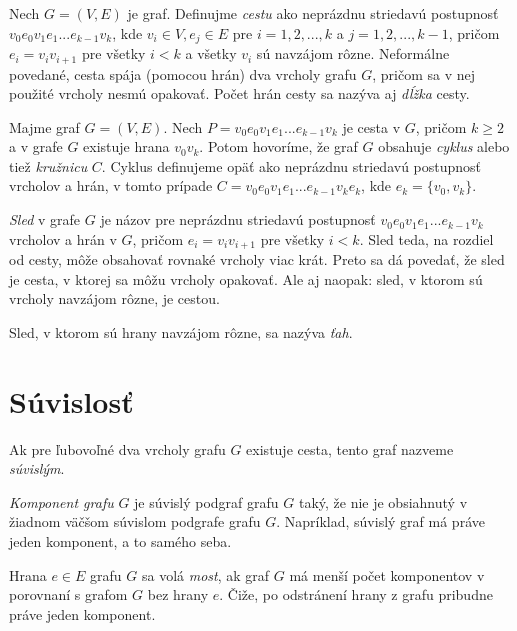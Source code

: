 Nech $G = (V, E)$ je graf. Definujme \textit{cestu} ako neprázdnu striedavú postupnosť $v_{0}e_{0}v_{1}e_{1} ... e_{k-1}v_{k}$, kde $ v_{i} \in V, e_{j} \in E$ pre $i = 1, 2, ..., k$ a $j = 1, 2, ..., k-1$, pričom $e_{i} = v_{i}v_{i+1}$ pre všetky $i < k$ a všetky $v_{i}$ sú navzájom rôzne. Neformálne povedané, cesta spája (pomocou hrán) dva vrcholy grafu $G$, pričom sa v nej použité vrcholy nesmú opakovať. Počet hrán cesty sa nazýva aj \textit{dĺžka} cesty.\newline

Majme graf $G = (V, E)$. Nech $P = v_{0}e_{0}v_{1}e_{1} ... e_{k-1}v_{k}$ je cesta v $G$, pričom $k\geq 2$ a v grafe $G$ existuje hrana $v_{0}v_{k}$. Potom hovoríme, že graf $G$ obsahuje \textit{cyklus} alebo tiež \textit{kružnicu} $C$. Cyklus definujeme opäť ako neprázdnu striedavú postupnosť vrcholov a hrán, v tomto prípade  $C = v_{0}e_{0}v_{1}e_{1} ... e_{k-1}v_{k}e_{k}$, kde $e_{k} = \{v_{0},v_{k}\}$.\newline

\textit{Sled} v grafe $G$ je názov pre neprázdnu striedavú postupnosť $v_{0}e_{0}v_{1}e_{1} ... e_{k-1}v_{k}$ vrcholov a hrán v $G$, pričom $e_{i} = v_{i}v_{i+1}$ pre všetky $i < k$. Sled teda, na rozdiel od cesty, môže obsahovať rovnaké vrcholy viac krát. Preto sa dá povedať, že sled je cesta, v ktorej sa môžu vrcholy opakovať. Ale aj naopak: sled, v ktorom sú vrcholy navzájom rôzne, je cestou.\newline

Sled, v ktorom sú hrany navzájom rôzne, sa nazýva \textit{ťah}.\newline


\section{Súvislosť}

Ak pre ľubovoľné dva vrcholy grafu $G$ existuje cesta, tento graf nazveme \textit{súvislým}. \newline

\textit{Komponent grafu} $G$ je súvislý podgraf grafu $G$ taký, že nie je obsiahnutý v žiadnom väčšom súvislom podgrafe grafu $G$. Napríklad, súvislý graf má práve jeden komponent, a to samého seba.\newline

Hrana $e \in E$ grafu $G$ sa volá \textit{most}, ak graf $G$ má menší počet komponentov v porovnaní s grafom $G$ bez hrany $e$. Čiže, po odstránení hrany z grafu pribudne práve jeden komponent.\newline

